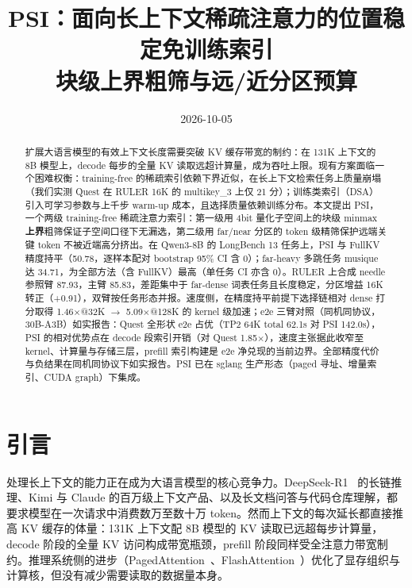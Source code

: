 \documentclass[11pt]{article}
\title{PSI：面向长上下文稀疏注意力的位置稳定免训练索引\\
\large 块级上界粗筛与远/近分区预算}
\date{2026-10-05}
\begin{document}
\maketitle

\begin{abstract}
扩展大语言模型的有效上下文长度需要突破 KV 缓存带宽的制约：在 131K 上下文的 8B 模型上，decode 每步的全量 KV 读取远超计算量，成为吞吐上限。现有方案面临一个困难权衡：training-free 的稀疏索引依赖下界近似，在长上下文检索任务上质量崩塌（我们实测 Quest 在 RULER 16K 的 multikey\_3 上仅 21 分）；训练类索引（DSA）引入可学习参数与上千步 warm-up 成本，且选择质量依赖训练分布。本文提出 PSI，一个两级 training-free 稀疏注意力索引：第一级用 4bit 量化子空间上的块级 minmax \textbf{上界}粗筛保证子空间口径下无漏选，第二级用 far/near 分区的 token 级精筛保护远端关键 token 不被近端高分挤出。在 Qwen3-8B 的 LongBench 13 任务上，PSI 与 FullKV 精度持平（50.78，逐样本配对 bootstrap 95\% CI 含 0）；far-heavy 多跳任务 musique 达 34.71，为全部方法（含 FullKV）最高（单任务 CI 亦含 0）。RULER 上合成 needle 参照臂 87.93，主臂 85.83，差距集中于 far-dense 词表任务且长度稳定，分区增益 16K 转正（+0.91），双臂按任务形态并报。速度侧，在精度持平前提下选择链相对 dense 打分取得 1.46$\times$@32K $\rightarrow$ 5.09$\times$@128K 的 kernel 级加速；e2e 三臂对照（同机同协议，30B-A3B）如实报告：Quest 全形状 e2e 占优（TP2 64K total 62.1s 对 PSI 142.0s），PSI 的相对优势点在 decode 段索引开销（对 Quest 1.85$\times$），速度主张据此收窄至 kernel、计算量与存储三层，prefill 索引构建是 e2e 净兑现的当前边界。全部精度代价与负结果在同机同协议下如实报告。PSI 已在 sglang 生产形态（paged 寻址、增量索引、CUDA graph）下集成。
\end{abstract}

\section{引言}

处理长上下文的能力正在成为大语言模型的核心竞争力。DeepSeek-R1~\cite{dsr1} 的长链推理、Kimi 与 Claude 的百万级上下文产品、以及长文档问答与代码仓库理解，都要求模型在一次请求中消费数万至数十万 token。然而上下文的每次延长都直接推高 KV 缓存的体量：131K 上下文配 8B 模型的 KV 读取已远超每步计算量，decode 阶段的全量 KV 访问构成带宽瓶颈，prefill 阶段同样受全注意力带宽制约。推理系统侧的进步（PagedAttention~\cite{vllm}、FlashAttention~\cite{fa}）优化了显存组织与计算核，但没有减少需要读取的数据量本身。
\end{document}
